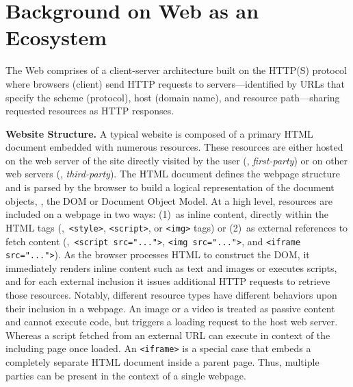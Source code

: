 \section{Background on Web as an Ecosystem}
\label{sec:background}
\vspace{-1mm}

The Web comprises of a client-server architecture built on the HTTP(S) protocol where browsers (client) send HTTP requests to servers---identified by URLs that specify the scheme (protocol), host (domain name), and resource path---sharing requested resources as HTTP responses.
%

\noindent \textbf{Website Structure.} 
%
A typical website is composed of a primary HTML document embedded with numerous resources. 
%
These resources are either hosted on the web server of the site directly visited by the user (\ie{}, \textit{first-party}) or on other web servers (\ie{}, \textit{third-party}).
%
The HTML document defines the webpage structure and is parsed by the browser to build a logical representation of the document objects, \ie{}, the DOM or Document Object Model. 
%
At a high level, resources are included on a webpage in two ways: (1)~as inline content, directly within the HTML tags (\eg{},~\texttt{<style>}, \texttt{<script>}, or \texttt{<img>} tags) or (2)~as external references to fetch content (\eg{},~\texttt{<script src="...">}, \texttt{<img src="...">}, and \texttt{<iframe src="...">}). 
%
As the browser processes HTML to construct the DOM, it immediately renders inline content such as text and images or executes scripts, and for each external inclusion it issues additional HTTP requests to retrieve those resources. 
%
%
Notably, different resource types have different behaviors upon their inclusion in a webpage.
%
An image or a video is treated as passive content and cannot execute code, but triggers a loading request to the host web server.
%
Whereas a script fetched from an external URL can execute in context of the including page once loaded.
%
An \texttt{<iframe>} is a special case that embeds a completely separate HTML document inside a parent page.
%
Thus, multiple parties can be present in the context of a single webpage.


